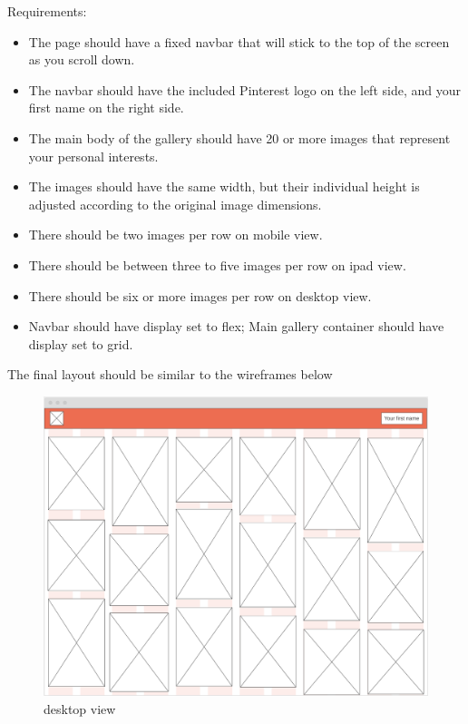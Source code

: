 \documentclass{42-en}
\begin{document}
\vspace{.1in}
Requirements:
\begin{itemize}
    \item The page should have a fixed navbar that will stick to the top of the screen as you scroll down.
    \item The navbar should have the included Pinterest logo on the left side, and your first name on the right side.
    \item The main body of the gallery should have 20 or more images that represent your personal interests.
    \item The images should have the same width, but their individual height is adjusted according to the original image dimensions.
    \item There should be two images per row on mobile view.
    \item There should be between three to five images per row on ipad view.
    \item There should be six or more images per row on desktop view.
    \item Navbar should have display set to flex; Main gallery container should have display set to grid.
\end{itemize}
\vspace{.5in}
The final layout should be similar to the wireframes below
\begin{figure}[H]
    \begin{center}
        \includegraphics[width=12cm]{wireframe-desktop.png}\\
        desktop view
    \end{center}
\end{figure}
\end{document}
